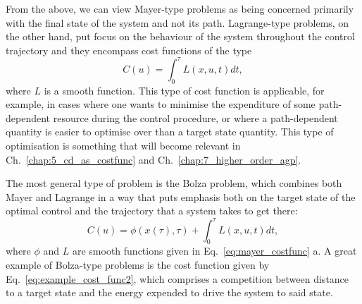 From the above, we can view Mayer-type problems as being concerned primarily with the final state of the system and not its path. Lagrange-type problems, on the other hand, put focus on the behaviour of the system throughout the control trajectory and they encompass cost functions of the type
\begin{equation}\label{eq:lagrange_type_costfunc}
    C(u) = \int_0^{\tau} L(x, u, t) dt,
\end{equation}
where $L$ is a smooth function. This type of cost function is applicable, for example, in cases where one wants to minimise the expenditure of some path-dependent resource during the control procedure, or where a path-dependent quantity is easier to optimise over than a target state quantity. This type of optimisation is something that will become relevant in Ch.~\ref{chap:5_cd_as_costfunc} and Ch.~\ref{chap:7_higher_order_agp}. 

The most general type of problem is the Bolza problem, which combines both Mayer and Lagrange in a way that puts emphasis both on the target state of the optimal control and the trajectory that a system takes to get there:
\begin{equation}\label{eq:bolza_tyoe_costfunc}
    C(u) = \phi(x(\tau), \tau) + \int_0^{\tau} L(x, u, t) dt,
\end{equation}
where $\phi$ and $L$ are smooth functions given in Eq.~\eqref{eq:mayer_costfunc} a. A great example of Bolza-type problems is the cost function given by Eq.~\eqref{eq:example_cost_func2}, which comprises a competition between distance to a target state and the energy expended to drive the system to said state. 

